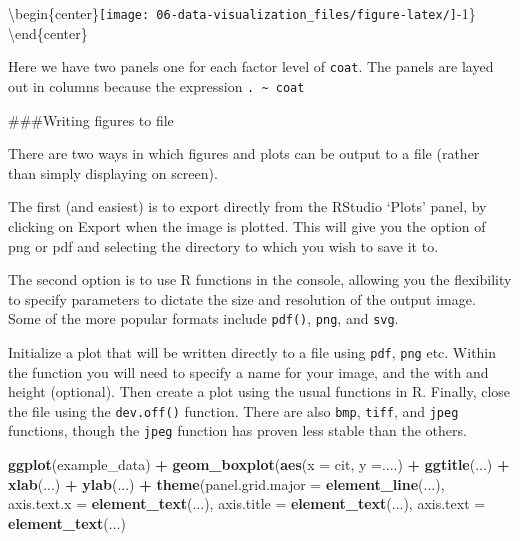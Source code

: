 \documentclass[11pt,]{article}
\newenvironment{Shaded}{\begin{snugshade}}{\end{snugshade}}
\newcommand{\DataTypeTok}[1]{\textcolor[rgb]{0.13,0.29,0.53}{#1}}
\newcommand{\KeywordTok}[1]{\textcolor[rgb]{0.13,0.29,0.53}{\textbf{#1}}}
\newcommand{\NormalTok}[1]{#1}
\newcommand{\OperatorTok}[1]{\textcolor[rgb]{0.81,0.36,0.00}{\textbf{#1}}}
\newcommand{\StringTok}[1]{\textcolor[rgb]{0.31,0.60,0.02}{#1}}
\begin{document}
\textbackslash{}begin\{center\}\texttt{[image: 06-data-visualization\_files/figure-latex/]}-1\}
\textbackslash{}end\{center\}

Here we have two panels one for each factor level of \texttt{coat}. The
panels are layed out in columns because the expression
\texttt{.\ \textasciitilde{}\ coat}

\#\#\#Writing figures to file

There are two ways in which figures and plots can be output to a file
(rather than simply displaying on screen).

The first (and easiest) is to export directly from the RStudio `Plots'
panel, by clicking on Export when the image is plotted. This will give
you the option of png or pdf and selecting the directory to which you
wish to save it to.

The second option is to use R functions in the console, allowing you the
flexibility to specify parameters to dictate the size and resolution of
the output image. Some of the more popular formats include
\texttt{pdf()}, \texttt{png}, and \texttt{svg}.

Initialize a plot that will be written directly to a file using
\texttt{pdf}, \texttt{png} etc. Within the function you will need to
specify a name for your image, and the with and height (optional). Then
create a plot using the usual functions in R. Finally, close the file
using the \texttt{dev.off()} function. There are also \texttt{bmp},
\texttt{tiff}, and \texttt{jpeg} functions, though the \texttt{jpeg}
function has proven less stable than the others.

\begin{Shaded}
\begin{Highlighting}[]
\KeywordTok{ggplot}\NormalTok{(example_data) }\OperatorTok{+}
\StringTok{  }\KeywordTok{geom_boxplot}\NormalTok{(}\KeywordTok{aes}\NormalTok{(}\DataTypeTok{x =}\NormalTok{ cit, }\DataTypeTok{y =}\NormalTok{....) }\OperatorTok{+}
\StringTok{  }\KeywordTok{ggtitle}\NormalTok{(...) }\OperatorTok{+}
\StringTok{  }\KeywordTok{xlab}\NormalTok{(...) }\OperatorTok{+}
\StringTok{  }\KeywordTok{ylab}\NormalTok{(...) }\OperatorTok{+}
\StringTok{  }\KeywordTok{theme}\NormalTok{(}\DataTypeTok{panel.grid.major =} \KeywordTok{element_line}\NormalTok{(...),}
          \DataTypeTok{axis.text.x =} \KeywordTok{element_text}\NormalTok{(...),}
          \DataTypeTok{axis.title =} \KeywordTok{element_text}\NormalTok{(...),}
          \DataTypeTok{axis.text =} \KeywordTok{element_text}\NormalTok{(...)}
\end{Highlighting}
\end{Shaded}
\end{document}
